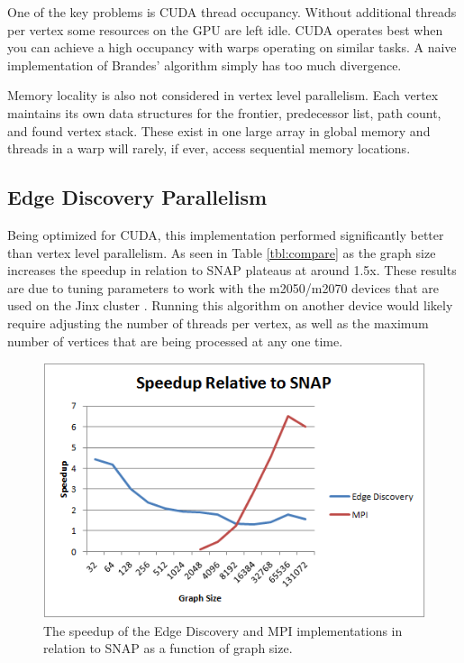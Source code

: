 \documentclass[10pt,twocolumn]{article}
\begin{document}
One of the key problems is CUDA thread occupancy. Without additional threads per vertex some resources on the GPU are left idle. CUDA operates best when you can achieve a high occupancy with warps operating on similar tasks. A naive implementation of Brandes' algorithm simply has too much divergence.

Memory locality is also not considered in vertex level parallelism. Each vertex maintains its own data structures for the frontier, predecessor list, path count, and found vertex stack. These exist in one large array in global memory and threads in a warp will rarely, if ever, access sequential memory locations.

\subsection{Edge Discovery Parallelism}
Being optimized for CUDA, this implementation performed significantly better than vertex level parallelism. As seen in Table \ref{tbl:compare} as the graph size increases the speedup in relation to SNAP plateaus at around 1.5x. These results are due to tuning parameters to work with the m2050/m2070 devices that are used on the Jinx cluster \cite{jinx}. Running this algorithm on another device would likely require adjusting the number of threads per vertex, as well as the maximum number of vertices that are being processed at any one time.

\begin{figure}[htbp]
\centering
\includegraphics[scale=.6]{speedup.png}
\caption{The speedup of the Edge Discovery and MPI implementations in relation to SNAP as a function of graph size.}
\label{fig:speedup}
\end{figure}
\end{document}
